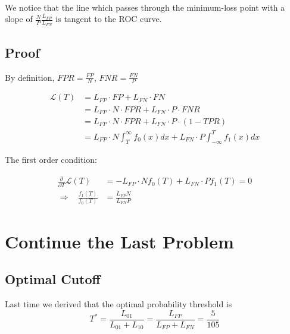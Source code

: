 \documentclass[11pt]{article}
\begin{document}
    \begin{center}
    \end{center}
    { \hspace*{\fill} \\}
    
    We notice that the line which passes through the minimum-loss point with
a slope of \(\frac{N}{P}\frac{L_{FP}}{L_{FN}}\) is tangent to the ROC
curve.

\subsection{Proof}\label{proof}

By definition, \(FPR = \frac{FP}{N}\), \(FNR=\frac{FN}{P}\)

\[
\begin{split}
\mathcal{L}(T) &= L_{FP}\cdot FP + L_{FN}\cdot FN \\
&= L_{FP}\cdot N \cdot FPR + L_{FN}\cdot P \cdot FNR \\
&= L_{FP}\cdot N \cdot FPR + L_{FN}\cdot P \cdot (1-TPR) \\
&= L_{FP}\cdot N \int_T^{\infty} f_0(x)dx + L_{FN}\cdot P \int_{-\infty}^{T} f_1(x)dx
\end{split}
\]

The first order condition:

\[
\begin{split}
\frac{\partial}{\partial T}\mathcal{L}(T) &= -L_{FP}\cdot N f_0(T) + L_{FN}\cdot P f_1(T) = 0\\
\Rightarrow ~~~~\frac{f_1(T)}{f_0(T)} &= \frac{L_{FP} N }{L_{FN} P}
\end{split}
\]

    \section{Continue the Last Problem}\label{continue-the-last-problem}

    \subsection{Optimal Cutoff}\label{optimal-cutoff}

Last time we derived that the optimal probability threshold is \[
T^* = \frac{L_{01}}{L_{01}+L_{10}} = \frac{L_{FP}}{L_{FP}+L_{FN}} = \frac{5}{105}
\]
\end{document}
